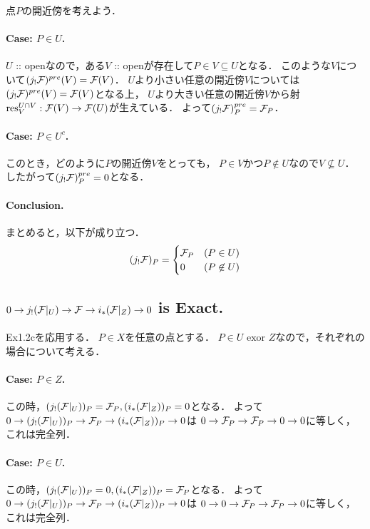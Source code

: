 \documentclass[a4paper]{jsarticle}
\begin{document}
    点$P$の開近傍を考えよう．

    \paragraph{Case: $P \in U$.}
    $U$ :: openなので，ある$V$ :: openが存在して$P \in V \subseteq U$となる．
    このような$V$について$(j_! \mathcal{F})^{pre}(V)=\mathcal{F}(V)$．
    $U$より小さい任意の開近傍$V$については$(j_! \mathcal{F})^{pre}(V)=\mathcal{F}(V)$となる上，
    $U$より大きい任意の開近傍$V$から射$\operatorname{res}_V^{U \cap V}: \mathcal{F}(V) \to \mathcal{F}(U)$が生えている．
    よって$(j_! \mathcal{F})^{pre}_P=\mathcal{F}_P$．

    \paragraph{Case: $P \in U^c$.}
    このとき，どのように$P$の開近傍$V$をとっても，
    $P \in V$かつ$P \not \in U$なので$V \not \subseteq U$．
    したがって$(j_! \mathcal{F})^{pre}_P=0$となる．

    \paragraph{Conclusion.}
    まとめると，以下が成り立つ．
    \[
        (j_! \mathcal{F})_P=
        \begin{cases}{}
            \mathcal{F}_P & (P \in U) \\
            0 & (P \not \in U)
        \end{cases}
    \]

    \subsection{$0 \to j_!(\mathcal{F}|_U) \to \mathcal{F} \to i_*(\mathcal{F}|_Z) \to 0$ is Exact.}
    Ex1.2cを応用する．
    $P \in X$を任意の点とする．
    $P \in U \text{ exor } Z$なので，それぞれの場合について考える．

    \paragraph{Case: $P \in Z$.}
    この時，$(j_!(\mathcal{F}|_U))_P=\mathcal{F}_P, (i_*(\mathcal{F}|_Z))_P=0$となる．
    よって$0 \to (j_!(\mathcal{F}|_U))_P \to \mathcal{F}_P \to (i_*(\mathcal{F}|_Z))_P \to 0$は
    $0 \to \mathcal{F}_P \to \mathcal{F}_P \to 0 \to 0$に等しく，これは完全列．

    \paragraph{Case: $P \in U$.}
    この時，$(j_!(\mathcal{F}|_U))_P=0, (i_*(\mathcal{F}|_Z))_P=\mathcal{F}_P$となる．
    よって$0 \to (j_!(\mathcal{F}|_U))_P \to \mathcal{F}_P \to (i_*(\mathcal{F}|_Z))_P \to 0$は
    $0 \to 0 \to \mathcal{F}_P \to \mathcal{F}_P \to 0$に等しく，これは完全列．
\end{document}
